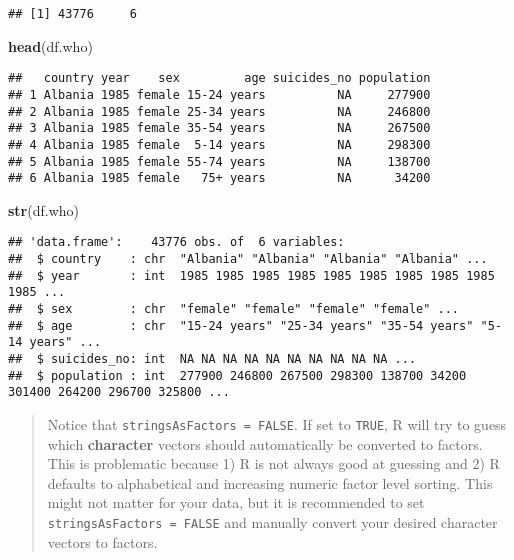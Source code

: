 \documentclass[]{article}
\newenvironment{Shaded}{\begin{snugshade}}{\end{snugshade}}
\newcommand{\KeywordTok}[1]{\textcolor[rgb]{0.13,0.29,0.53}{\textbf{#1}}}
\newcommand{\NormalTok}[1]{#1}
\begin{document}
\begin{verbatim}
## [1] 43776     6
\end{verbatim}

\begin{Shaded}
\begin{Highlighting}[]
\KeywordTok{head}\NormalTok{(df.who)}
\end{Highlighting}
\end{Shaded}

\begin{verbatim}
##   country year    sex         age suicides_no population
## 1 Albania 1985 female 15-24 years          NA     277900
## 2 Albania 1985 female 25-34 years          NA     246800
## 3 Albania 1985 female 35-54 years          NA     267500
## 4 Albania 1985 female  5-14 years          NA     298300
## 5 Albania 1985 female 55-74 years          NA     138700
## 6 Albania 1985 female   75+ years          NA      34200
\end{verbatim}

\begin{Shaded}
\begin{Highlighting}[]
\KeywordTok{str}\NormalTok{(df.who)}
\end{Highlighting}
\end{Shaded}

\begin{verbatim}
## 'data.frame':    43776 obs. of  6 variables:
##  $ country    : chr  "Albania" "Albania" "Albania" "Albania" ...
##  $ year       : int  1985 1985 1985 1985 1985 1985 1985 1985 1985 1985 ...
##  $ sex        : chr  "female" "female" "female" "female" ...
##  $ age        : chr  "15-24 years" "25-34 years" "35-54 years" "5-14 years" ...
##  $ suicides_no: int  NA NA NA NA NA NA NA NA NA NA ...
##  $ population : int  277900 246800 267500 298300 138700 34200 301400 264200 296700 325800 ...
\end{verbatim}

\begin{quote}
Notice that \texttt{stringsAsFactors\ =\ FALSE}. If set to
\texttt{TRUE}, R will try to guess which \textbf{character} vectors
should automatically be converted to factors. This is problematic
because 1) R is not always good at guessing and 2) R defaults to
alphabetical and increasing numeric factor level sorting. This might not
matter for your data, but it is recommended to set
\texttt{stringsAsFactors\ =\ FALSE} and manually convert your desired
character vectors to factors.
\end{quote}
\end{document}
